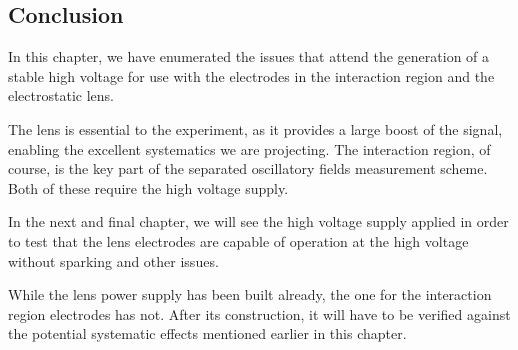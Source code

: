 \subsection{Conclusion}


In this chapter, we have enumerated the issues that attend the generation of a
stable high voltage for use with the electrodes in the interaction region and
the electrostatic lens.


The lens is essential to the experiment, as it provides a large boost of the
signal, enabling the excellent systematics we are projecting. The interaction
region, of course, is the key part of the separated oscillatory fields
measurement scheme. Both of these require the high voltage supply.


In the next and final chapter, we will see the high voltage supply applied in
order to test that the lens electrodes are capable of operation at the high
voltage without sparking and other issues.


While the lens power supply has been built already, the one for the interaction
region electrodes has not. After its construction, it will have to be verified
against the potential systematic effects mentioned earlier in this chapter.
